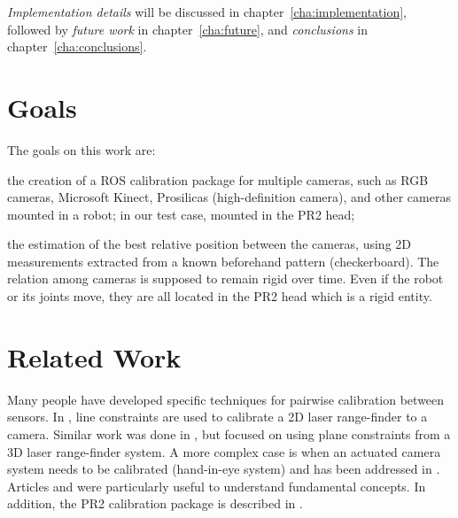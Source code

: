 \textit{Implementation details} will be discussed in chapter~\ref{cha:implementation}, followed by \textit{future work} in chapter~\ref{cha:future}, and \textit{conclusions} in chapter~\ref{cha:conclusions}.




\section{Goals}

The goals on this work are:
\begin{itemize*}
  \item the creation of a ROS calibration package for multiple cameras, such as RGB cameras, Microsoft Kinect, Prosilicas (high-definition camera), and other cameras mounted in a robot; in our test case, mounted in the PR2 head;

 \item the estimation of the best relative position between the cameras, using 2D measurements extracted from a known beforehand pattern (checkerboard). The relation among cameras is supposed to remain rigid over time. Even if the robot or its joints move, they are all located in the PR2 head which is a rigid entity.
\end{itemize*}




\section{Related Work}

Many people have developed specific techniques for pairwise calibration between
sensors. In \cite{Zhang04extrinsiccalibration}, line constraints are used to calibrate a 2D laser range-finder to a camera. Similar work was done in \cite{Unnikrishnan_fastextrinsic}, but focused on using plane constraints from a 3D laser range-finder system. A more complex case is when an actuated camera system needs to be calibrated (hand-in-eye system) and has been addressed in \cite{Horaud_hand-eyecalibration}. Articles \cite{Dynamic_camera_calibration} and \cite{4587681} were particularly useful to understand fundamental concepts. In addition, the PR2 calibration package is described in \cite{pr2_calibration_paper}.

